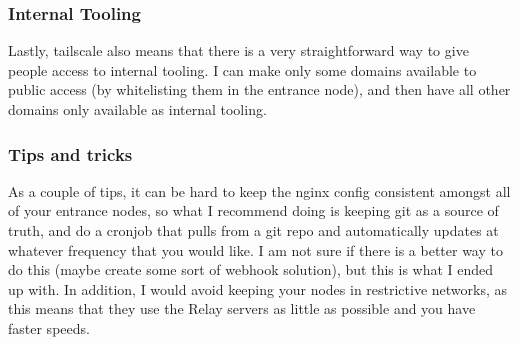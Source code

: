 \documentclass[12pt]{article}
\begin{document}
\subsubsection{Internal Tooling}
Lastly, tailscale also means that there is a very straightforward way to give people access to internal tooling. I can make only some domains available to public access (by whitelisting them in the entrance node), and then have all other domains only available as internal tooling.

\subsubsection{Tips and tricks}
As a couple of tips, it can be hard to keep the nginx config consistent amongst all of your entrance nodes, so what I recommend doing is keeping git as a source of truth, and do a cronjob that pulls from a git repo and automatically updates at whatever frequency that you would like. I am not sure if there is a better way to do this (maybe create some sort of webhook solution), but this is what I ended up with. In addition, I would avoid keeping your nodes in restrictive networks, as this means that they use the Relay servers as little as possible and you have faster speeds.
\end{document}
